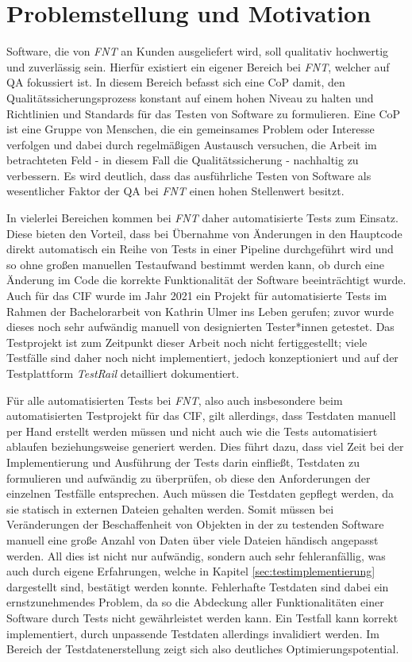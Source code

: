 \section{Problemstellung und Motivation}\label{sec:motivation}
Software, die von \textit{FNT} an Kunden ausgeliefert wird, soll qualitativ hochwertig und zuverlässig sein. Hierfür existiert ein eigener Bereich bei \textit{FNT}, welcher auf \ac{QA} fokussiert ist. In diesem Bereich befasst sich eine \ac{CoP} damit, den Qualitätssicherungsprozess konstant auf einem hohen Niveau zu halten und Richtlinien und Standards für das Testen von Software zu formulieren. Eine \ac{CoP} ist eine Gruppe von Menschen, die ein gemeinsames Problem oder Interesse verfolgen und dabei durch regelmäßigen Austausch versuchen, die Arbeit im betrachteten Feld - in diesem Fall die Qualitätssicherung - nachhaltig zu verbessern. \cite{wenger:2022} Es wird deutlich, dass das ausführliche Testen von Software als wesentlicher Faktor der \ac{QA} bei \textit{FNT} einen hohen Stellenwert besitzt.

In vielerlei Bereichen kommen bei \textit{FNT} daher automatisierte Tests zum Einsatz. Diese bieten den Vorteil, dass bei Übernahme von Änderungen in den Hauptcode direkt automatisch ein Reihe von Tests in einer Pipeline durchgeführt wird und so ohne großen manuellen Testaufwand bestimmt werden kann, ob durch eine Änderung im Code die korrekte Funktionalität der Software beeinträchtigt wurde. Auch für das \ac{CIF} wurde im Jahr 2021 ein Projekt für automatisierte Tests im Rahmen der Bachelorarbeit von Kathrin Ulmer ins Leben gerufen; zuvor wurde dieses noch sehr aufwändig manuell von designierten Tester*innen getestet. \cite{ulmer:2021} Das Testprojekt ist zum Zeitpunkt dieser Arbeit noch nicht fertiggestellt; viele Testfälle sind daher noch nicht implementiert, jedoch konzeptioniert und auf der Testplattform \textit{TestRail} detailliert dokumentiert.

Für alle automatisierten Tests bei \textit{FNT}, also auch insbesondere beim automatisierten Testprojekt für das \ac{CIF}, gilt allerdings, dass Testdaten manuell per Hand erstellt werden müssen und nicht auch wie die Tests automatisiert ablaufen beziehungsweise generiert werden. Dies führt dazu, dass viel Zeit bei der Implementierung und Ausführung der Tests darin einfließt, Testdaten zu formulieren und aufwändig zu überprüfen, ob diese den Anforderungen der einzelnen Testfälle entsprechen. Auch müssen die Testdaten gepflegt werden, da sie statisch in externen Dateien gehalten werden. Somit müssen bei Veränderungen der Beschaffenheit von Objekten in der zu testenden Software manuell eine große Anzahl von Daten über viele Dateien händisch angepasst werden. All dies ist nicht nur aufwändig, sondern auch sehr fehleranfällig, was auch durch eigene Erfahrungen, welche in Kapitel \ref{sec:testimplementierung} dargestellt sind, bestätigt werden konnte. Fehlerhafte Testdaten sind dabei ein ernstzunehmendes Problem, da so die Abdeckung aller Funktionalitäten einer Software durch Tests nicht gewährleistet werden kann. Ein Testfall kann korrekt implementiert, durch unpassende Testdaten allerdings invalidiert werden. \cite[S. 137]{oregan:2019} Im Bereich der Testdatenerstellung zeigt sich also deutliches Optimierungspotential.

